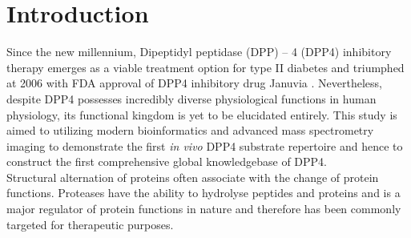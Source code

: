 \section{Introduction}
\label{sec:intro}

Since the new millennium, Dipeptidyl peptidase (DPP) – 4 (DPP4) inhibitory therapy emerges as a viable treatment option for type II diabetes and triumphed at 2006 with FDA approval of DPP4 inhibitory drug Januvia \cite{RN822}.  Nevertheless, despite DPP4 possesses incredibly diverse physiological functions in human physiology, its functional kingdom is yet to be elucidated entirely. This study is aimed to utilizing modern bioinformatics and advanced mass spectrometry imaging to demonstrate the first \textit{in vivo}  DPP4 substrate repertoire and hence to construct the first comprehensive global knowledgebase of DPP4. \\

Structural alternation of proteins often associate with the change of protein functions. Proteases have the ability to hydrolyse peptides and proteins and is a major regulator of protein functions in nature and therefore has been commonly targeted for therapeutic purposes. 


